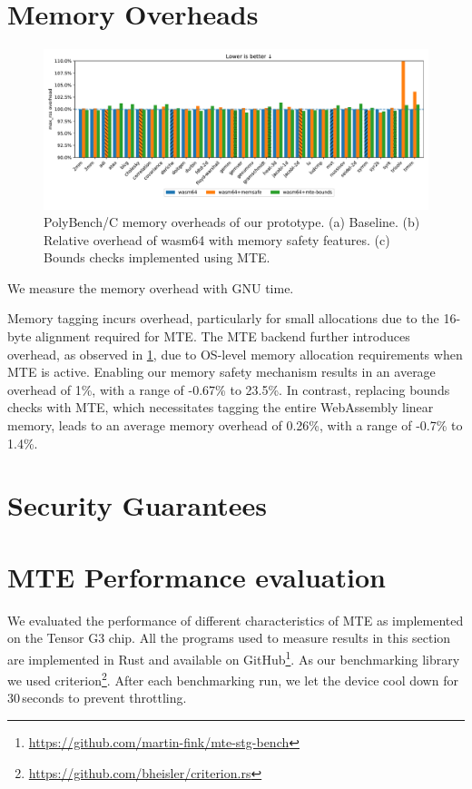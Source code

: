 \section{Memory Overheads}\label{sec:memory-overheads}

\begin{figure}[ht]
    \centering
    \includegraphics[width=\textwidth]{./plots/mem-overhead}
    \caption{{PolyBench/C memory overheads of our prototype. (a) Baseline. (b) Relative overhead of wasm64 with memory safety features. (c) Bounds checks implemented using MTE.}{}}
    \label{fig:memory_overheads}
\end{figure}

We measure the memory overhead with GNU time.

Memory tagging incurs overhead, particularly for small allocations due to the 16-byte alignment required for MTE.
The MTE backend further introduces overhead, as observed in \cref{fig:memory_overheads}, due to OS-level memory allocation requirements when MTE is active.
Enabling our memory safety mechanism results in an average overhead of 1\%, with a range of -0.67\% to 23.5\%.
In contrast, replacing bounds checks with MTE, which necessitates tagging the entire WebAssembly linear memory, leads to an average memory overhead of 0.26\%, with a range of -0.7\% to 1.4\%.


\section{Security Guarantees}\label{sec:security-guarantees}



\section{MTE Performance evaluation}
\label{sec:mte-performance-evaluation}

We evaluated the performance of different characteristics of \ac{MTE} as implemented on the Tensor G3 chip.
All the programs used to measure results in this section are implemented in Rust and available on GitHub\footnote{\url{https://github.com/martin-fink/mte-stg-bench}}.
As our benchmarking library we used criterion\footnote{\url{https://github.com/bheisler/criterion.rs}}.
After each benchmarking run, we let the device cool down for 30\,seconds to prevent throttling.


